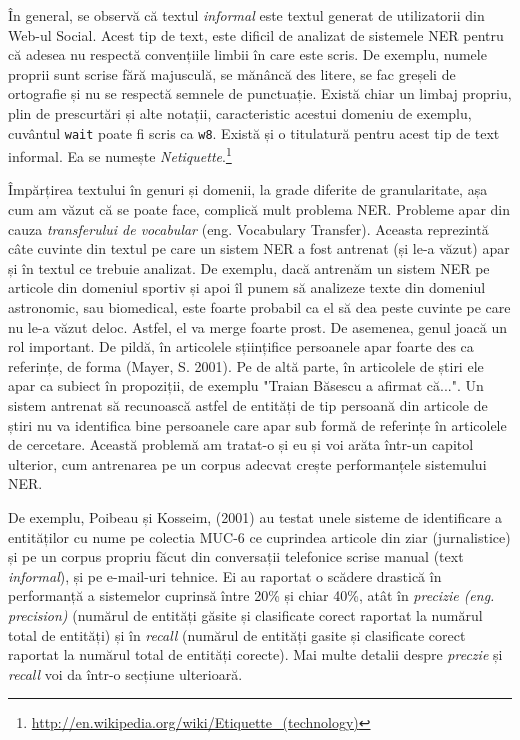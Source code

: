 În general, se observă că textul \textit{informal} este textul generat de utilizatorii din Web-ul Social. Acest tip de text, este dificil de analizat de sistemele NER pentru că adesea nu respectă convențiile limbii în care este scris. De exemplu, numele proprii sunt scrise fără majusculă, se mănâncă des litere, se fac greșeli de ortografie și nu se respectă semnele de punctuație. Există chiar un limbaj propriu, plin de prescurtări și alte notații, caracteristic acestui domeniu de exemplu, cuvântul \texttt{wait} poate fi scris ca \texttt{w8}. Există și o titulatură pentru acest tip de text informal. Ea se numește \textit{Netiquette}.\footnote{\url{http://en.wikipedia.org/wiki/Etiquette_(technology)}}

Împărțirea textului în genuri și domenii, la grade diferite de granularitate, așa cum am văzut că se poate face, complică mult problema NER. Probleme apar din cauza \textit{transferului de vocabular} (eng. Vocabulary Transfer). Aceasta reprezintă câte cuvinte din textul pe care un sistem NER a fost antrenat (și le-a văzut) apar și în textul ce trebuie analizat. De exemplu, dacă antrenăm un sistem NER pe articole din domeniul sportiv și apoi îl punem să analizeze texte din domeniul astronomic, sau biomedical, este foarte probabil ca el să dea peste cuvinte pe care nu le-a văzut deloc. Astfel, el va merge foarte prost. De asemenea, genul joacă un rol important. De pildă, în articolele sțiințifice persoanele apar foarte des ca referințe, de forma (Mayer, S. 2001). Pe de altă parte, în articolele de știri ele apar ca subiect în propoziții, de exemplu "Traian Băsescu a afirmat că...". Un sistem antrenat să recunoască astfel de entități de tip persoană din articole de știri nu va identifica bine persoanele care apar sub formă de referințe în articolele de cercetare. Această problemă am tratat-o și eu și voi arăta într-un capitol ulterior, cum antrenarea pe un corpus adecvat crește performanțele sistemului NER.


De exemplu, Poibeau și Kosseim, (2001) \cite{Poibeau01propername} au testat unele sisteme de identificare a entităților cu nume pe colectia MUC-6 ce cuprindea articole din ziar (jurnalistice) și pe un corpus propriu făcut din conversații telefonice scrise manual (text \textit{informal}), și pe e-mail-uri tehnice. Ei au raportat o scădere drastică în performanță a sistemelor cuprinsă între 20\% și chiar 40\%, atât în \textit{precizie (eng. precision)} (numărul de entități  găsite și clasificate corect raportat la numărul total de entități) și în \textit{recall} (numărul de entități gasite și clasificate corect raportat la numărul total de entități corecte). Mai multe detalii despre \textit{preczie} și \textit{recall} voi da într-o secțiune ulterioară.


